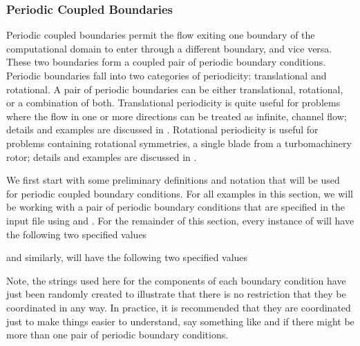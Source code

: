 \subsubsection{Periodic Coupled Boundaries}
\label{SEC:BC:Numerical:Periodic}




Periodic coupled boundaries permit the flow exiting one boundary of the
computational domain to enter through a different boundary, and vice versa.
%
These two boundaries form a coupled pair of periodic boundary conditions.
%
Periodic boundaries fall into two categories of periodicity: translational and
rotational. A pair of periodic boundaries can be either translational,
rotational, or a combination of both.
%
Translational periodicity is quite useful for problems where the flow in one or
more directions can be treated as infinite, \forexample channel flow; details
and examples are discussed in
.
%
Rotational periodicity is useful for problems containing rotational symmetries,
\forexample a single blade from a turbomachinery rotor; details and examples are
discussed in .


We first start with some preliminary definitions and notation that will be used
for periodic coupled boundary conditions.
%
For all examples in this section, we will be working with a pair of periodic
boundary conditions that are specified in the input file using \BCinptext[i]{}
and \BCinptext[j]{}.
%
For the remainder of this section, every instance of \BCinptext[i]{} will have
the following two specified values
%
\begin{InputExample}
  \item[{\BCinptext[i]{Name = "Face Side A"}}]
  \item[{\BCinptext[i]{Set\_BC\_Value = 81}}]
\end{InputExample}
%
and similarly, \BCinptext[j] will have the following two specified values
%
\begin{InputExample}
  \item[{\BCinptext[j]{Name = "Periodic-2"}}]
  \item[{\BCinptext[j]{Set\_BC\_Value = 81}}]
\end{InputExample}
%
Note, the strings used here for the  components of each boundary
condition have just been randomly created to illustrate that there is no
restriction that they be coordinated in any way.
%
In practice, it is recommended that they are coordinated just to make things
easier to understand, say something like  and
 if there might be more than one pair of periodic
boundary conditions.

